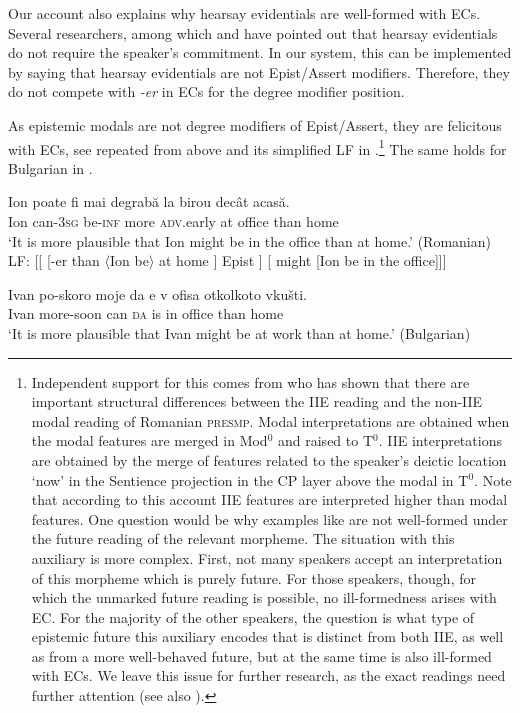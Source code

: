 \documentclass[output=paper,
]{langscibook}
\begin{document}
\noindent Our account also explains why hearsay evidentials are well-formed with ECs. Several researchers, among which \citet{fall02} and \citet{smir13} have pointed out that hearsay evidentials do not require the speaker's commitment. In our system, this can be implemented by saying that hearsay evidentials are not Epist/Assert modifiers. Therefore, they do not compete with \textit{-er} in ECs for the degree modifier position.
        
 As epistemic modals are not degree modifiers of Epist/Assert, they are felicitous with ECs, see  repeated from above and its simplified LF in .\footnote{Independent support for this comes from \citet{iri18} who has shown that there are important structural differences between the IIE reading and the non-IIE modal reading of Romanian \textsc{presmp}. Modal interpretations are obtained when the modal features are merged in Mod$^0$ and raised to T$^0$. IIE interpretations are obtained by the merge of features related to the speaker's deictic location `now' in the  Sentience projection in the CP layer above the modal in T$^0$. Note that according to this account IIE features are interpreted higher than modal features. One question would be why examples like  are not well-formed under the future reading of the relevant morpheme. The situation with this auxiliary is more complex. First, not many speakers accept an interpretation of this morpheme which is purely future. For those speakers, though, for which the unmarked future reading is possible, no ill-formedness arises with EC. For the majority of the other speakers, the question is what type of epistemic future this auxiliary encodes that is distinct from both IIE, as well as from a more well-behaved future, but at the same time is also ill-formed with ECs. We leave this issue for further research, as the exact readings need further attention (see also \citealt{mih13}).
} 
The same holds for Bulgarian in . 

 	\ea \ea \gll Ion poate fi mai degrabă la birou decât acasă.  \\
Ion 	can-\textsc{3sg} be-\textsc{inf} more \textsc{adv}.early at office than home \\ 
		\glt `It is more plausible that Ion might be in the office than at home.' \hfill (Romanian) \label{mightroma}
   	 \ex LF: [[ { [-er than $\langle$Ion be$\rangle$ at home ] } Epist ] [ might [Ion be in the office]]] \label{mightromb}
     \z \z 
    
	\ea \gll Ivan po-skoro moje da e 	v	ofisa	otkolkoto vkušti.  \\	
Ivan	more-soon	can \textsc{da} is 	in	office	than home \\ 
        \glt `It is more plausible that Ivan might be at work than at home.' \hfill (Bulgarian) \label{mightbul}
        \z 
\end{document}
